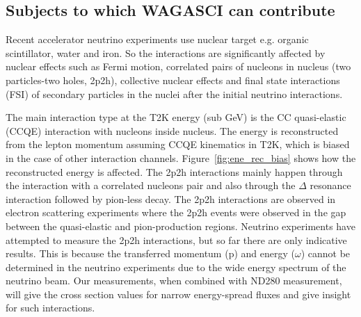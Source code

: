 \subsection{Subjects to which WAGASCI can contribute}
Recent accelerator neutrino experiments use nuclear target e.g. organic scintillator, water and iron.
So the interactions are significantly affected by
nuclear effects such as Fermi motion, correlated pairs of nucleons in nucleus (two particles-two holes, 2p2h), collective nuclear effects 
and final state interactions (FSI) of secondary particles in the nuclei after the initial neutrino interactions.

The main interaction type at the T2K energy (sub GeV) is the CC quasi-elastic (CCQE) interaction with nucleons inside nucleus.
The energy is reconstructed from the lepton momentum assuming CCQE kinematics 
in T2K, which is biased in the case of other interaction channels.
Figure~\ref{fig:ene_rec_bias} shows how the reconstructed energy is affected.
The 2p2h interactions mainly happen through the interaction with a correlated nucleons pair and also through the $\Delta$ resonance interaction
followed by pion-less decay.
The 2p2h interactions are observed in electron scattering experiments \cite{escattering} where the 2p2h events were observed in
the gap between the quasi-elastic and pion-production regions.
Neutrino experiments have attempted to measure the 2p2h interactions, but so far there are only indicative results.
This is because the transferred momentum (p) and energy ($\omega$) cannot be determined in the neutrino experiments due to the wide energy spectrum of the neutrino beam.
Our measurements, when combined with ND280 measurement, will give the cross section values for narrow energy-spread fluxes
and give insight for such interactions. 
